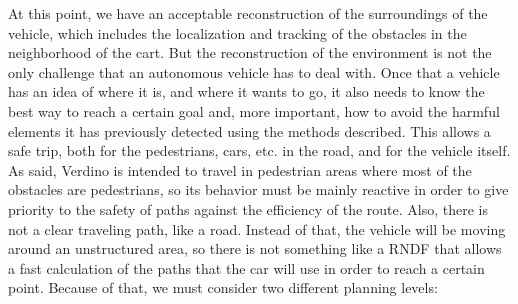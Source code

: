 At this point, we have an acceptable reconstruction of the surroundings of the vehicle, which includes the localization and tracking of the obstacles in the neighborhood of the cart. But the reconstruction of the environment is not the only challenge that an autonomous vehicle has to deal with. Once that a vehicle has an idea of where it is, and where it wants to go, it also needs to know the best way to reach a certain goal and, more important, how to avoid the harmful elements it has previously detected using the methods described. This allows a safe trip, both for the pedestrians, cars, etc. in the road, and for the vehicle itself.
As said, Verdino is intended to travel in pedestrian areas where most of the obstacles are pedestrians, so its behavior must be mainly reactive in order to give priority to the safety of paths against the efficiency of the route. Also, there is not a clear traveling path, like a road. Instead of that, the vehicle will be moving around an unstructured area, so there is not something like a \ac{RNDF} that allows a fast calculation of the paths that the car will use in order to reach a certain point. Because of that, we must consider two different planning levels:
